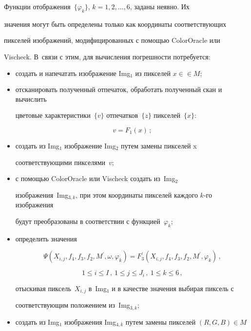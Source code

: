Функции отображения~$\{\varphi_k\}$, $k=1,2,\ldots ,6$, заданы неявно. Их


значения могут быть определены только как координаты соответствующих


пикселей изображений, модифицированных  с по\-мощью ColorOracle или


Vischeck. В~связи с этим, для вычисления погрешности потребуется:


\begin{itemize}


\item создать и напечатать изображение Img$_1$ из пикселей $x\in$\linebreak $\in M$;


\item отсканировать полученный отпечаток,  обработать полученный скан и вычислить


цветовые характеристики~$\{v\}$ отпечатков~$\{z\}$ пикселей~$\{x\}$:


$$


v=F_1(x)\,;


$$


\item создать из Img$_1$ изображение Img$_2$ путем замены пикселей x


соответствующими пикселями~$v$;


\item с помощью ColorOracle или Vischeck создать из~Img$_2$


изоб\-ра\-же\-ния~Img$_{3,k}$, при этом координаты пикселей каждого $k$-го изображения


будут преобразованы в соответствии с функцией~$\varphi_k$;


\item определить значения


$$


\Psi


(X_{i,j},f_4,f_3,f_2,M^\prime,\omega,\varphi_k)=F^\prime_3(X_{i,j},f_4,f_3,f_2,M^\prime,\varphi_k)\,,$$%


$$


1\leq i\leq I\,,\  1\leq j\leq J_i\,,\  1\leq k\leq 6\,,


$$


отыскивая пиксель~$X_{i,j}$ в~Img$_1$ и в качестве значения выбирая пиксель с


соответствующим положением из~Img$_{3,k}$;


\item создать из Img$_1$ изображения Img$_{4,k}$ путем замены пикселей $(R,G,B)\in M$



\end{itemize}
